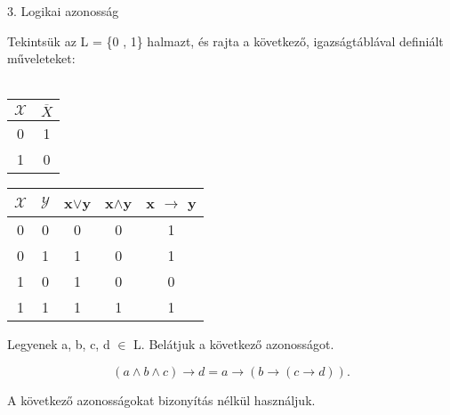 \documentclass{article}
\begin{document}
\begin{huge}
3. Logikai azonosság
\end{huge}

Tekintsük az L = \{0 , 1\} halmazt, és rajta a következő, igazságtáblával definiált műveleteket:
\\
\\
\begin{table}[!htb]

\begin{tabular}{c||c}
$\mathcal{X}$ & $\overline{X}$ \\ \hline
0 & 1 \\
1 & 0

\end{tabular}

\begin{tabular}{c|c||c|c|c}
$\mathcal{X}$ & $\mathcal{Y}$ & x$\lor$y & x$\land$y & x $\to$ y\\ \hline
0 & 0 & 0 & 0 & 1 \\
0 & 1 & 1 & 0 & 1 \\
1 & 0 & 1 & 0 & 0 \\
1 & 1 & 1 & 1 & 1
\end{tabular}
\end{table}

Legyenek a, b, c, d $\in$ L. Belátjuk a következő azonosságot.

\[
(a \land b \land c) \to d = a \to (b \to (c \to d)).
\]

A következő azonosságokat bizonyítás nélkül használjuk.


 
\end{document}
